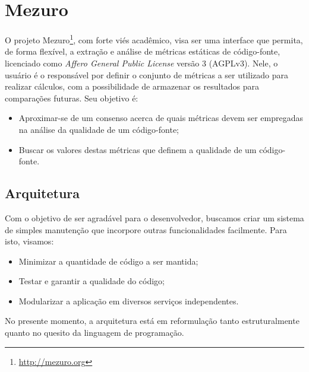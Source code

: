 \documentclass{llncs}
\begin{document}
\section{Mezuro}
O projeto Mezuro\footnote{\url{http://mezuro.org}}, com forte viés acadêmico, visa ser uma interface que permita, de forma flexível, a extração e análise de métricas estáticas de código-fonte, licenciado como \textit{Affero General Public License} versão 3 (AGPLv3). Nele, o usuário é o responsável por definir o conjunto de métricas a ser utilizado para realizar cálculos, com a possibilidade de armazenar os resultados para comparações futuras. Seu objetivo é:
\begin{itemize}
    \item Aproximar-se de um consenso acerca de quais métricas devem ser empregadas na análise da qualidade de um código-fonte;
    \item Buscar os valores destas métricas que definem a qualidade de um código-fonte.
\end{itemize}

  \subsection{Arquitetura}
  Com o objetivo de ser agradável para o desenvolvedor, buscamos criar um sistema de simples manutenção que incorpore outras funcionalidades facilmente. Para isto, visamos:
  \begin{itemize}
    \item Minimizar a quantidade de código a ser mantida;
    \item Testar e garantir a qualidade do código;
    \item Modularizar a aplicação em diversos serviços independentes.
  \end{itemize}

  No presente momento, a arquitetura está em reformulação tanto estruturalmente quanto no quesito da linguagem de programação.
\end{document}

